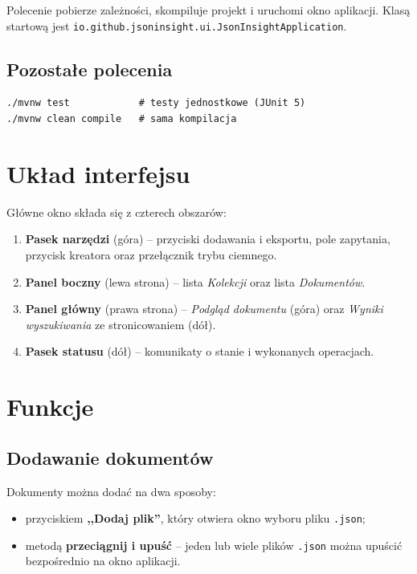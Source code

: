 \documentclass[a4paper,12pt]{article}
\begin{document}
Polecenie pobierze zależności, skompiluje projekt i uruchomi okno aplikacji.
Klasą startową jest \texttt{io.github.jsoninsight.ui.JsonInsightApplication}.

\subsection{Pozostałe polecenia}

\begin{lstlisting}
./mvnw test            # testy jednostkowe (JUnit 5)
./mvnw clean compile   # sama kompilacja
\end{lstlisting}

\section{Układ interfejsu}

Główne okno składa się z czterech obszarów:

\begin{enumerate}[noitemsep]
  \item \textbf{Pasek narzędzi} (góra) -- przyciski dodawania i eksportu, pole zapytania,
        przycisk kreatora oraz przełącznik trybu ciemnego.
  \item \textbf{Panel boczny} (lewa strona) -- lista \emph{Kolekcji} oraz lista
        \emph{Dokumentów}.
  \item \textbf{Panel główny} (prawa strona) -- \emph{Podgląd dokumentu} (góra) oraz
        \emph{Wyniki wyszukiwania} ze stronicowaniem (dół).
  \item \textbf{Pasek statusu} (dół) -- komunikaty o stanie i wykonanych operacjach.
\end{enumerate}

\section{Funkcje}

\subsection{Dodawanie dokumentów}

Dokumenty można dodać na dwa sposoby:

\begin{itemize}[noitemsep]
  \item przyciskiem \textbf{,,Dodaj plik''}, który otwiera okno wyboru pliku \texttt{.json};
  \item metodą \textbf{przeciągnij i upuść} -- jeden lub wiele plików \texttt{.json}
        można upuścić bezpośrednio na okno aplikacji.
\end{itemize}
\end{document}
